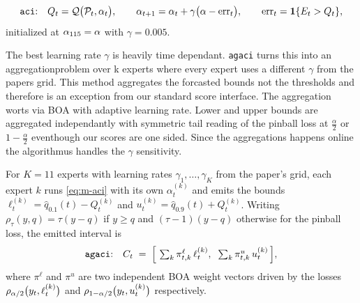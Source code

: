 \begin{equation}
  \text{\texttt{aci}:}\quad
  Q_t = \mathcal{Q}\big(\mathcal{P}_t, \alpha_t\big),
  \qquad
  \alpha_{t+1} = \alpha_t + \gamma\big(\alpha - \mathrm{err}_t\big),
  \qquad
  \mathrm{err}_t = \mathbf{1}\{E_t > Q_t\},
  \label{eq:m-aci}
\end{equation}
initialized at $\alpha_{115} = \alpha$ with $\gamma = 0.005$.


The best learning rate $\gamma$ is heavily time dependant. \texttt{agaci} \parencite{zaffran2022agaci} turns this into an aggregationproblem over k experts where every expert uses a different $\gamma$ from the papers grid. This method aggregates the forcasted bounds not the thresholds and therefore is an exception from our standard score interface. The aggregation worts via BOA \parencite{wintenberger2017boa} with adaptive learning rate. Lower and upper bounds are aggregated independantly with symmetric tail reading of the pinball loss at $\frac{\alpha}{2}$ or $1-\frac{\alpha}{2}$ eventhough our scores are one sided. Since the aggregations happens online the algorithmus handles the $\gamma$ sensitivity.

For $K = 11$ experts with learning rates $\gamma_1, \dots, \gamma_K$ from the
paper's grid, each expert $k$ runs \cref{eq:m-aci} with its own $\alpha_t^{(k)}$
and emits the bounds
$\ell_t^{(k)} = \hat q_{0.1}(t) - Q_t^{(k)}$ and
$u_t^{(k)} = \hat q_{0.9}(t) + Q_t^{(k)}$. Writing
$\rho_\tau(y, q) = \tau (y - q)$ if $y \ge q$ and $(\tau - 1)(y - q)$ otherwise
for the pinball loss, the emitted interval is
\begin{equation}
  \text{\texttt{agaci}:}\quad
  C_t \;=\;
  \Big[\, \textstyle\sum_k \pi_{t,k}^{\ell}\, \ell_t^{(k)},\;\;
          \sum_k \pi_{t,k}^{u}\, u_t^{(k)} \,\Big],
  \label{eq:m-agaci}
\end{equation}
where $\pi^{\ell}$ and $\pi^{u}$ are two independent BOA weight vectors
driven by the losses $\rho_{\alpha/2}\big(y_t, \ell_t^{(k)}\big)$ and
$\rho_{1-\alpha/2}\big(y_t, u_t^{(k)}\big)$ respectively.

